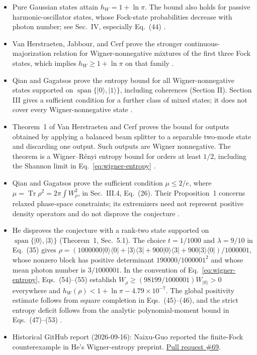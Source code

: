 \begin{itemize}
  \item Pure Gaussian states attain $h_W=1+\ln\pi$. The bound also holds for passive harmonic-oscillator states, whose Fock-state probabilities decrease with photon number; see Sec.~IV, especially Eq.~(44) .

  \item Van Herstraeten, Jabbour, and Cerf prove the stronger continuous-majorization relation for Wigner-nonnegative mixtures of the first three Fock states, which implies $h_W\geq1+\ln\pi$ on that family .

  \item Qian and Gagatsos prove the entropy bound for all Wigner-nonnegative states supported on $\operatorname{span}\{|0\rangle,|1\rangle\}$, including coherences (Section II). Section III gives a sufficient condition for a further class of mixed states; it does not cover every Wigner-nonnegative state .

  \item Theorem~1 of Van Herstraeten and Cerf proves the bound for outputs obtained by applying a balanced beam splitter to a separable two-mode state and discarding one output. Such outputs are Wigner nonnegative. The theorem is a Wigner--R\'enyi entropy bound for orders at least $1/2$, including the Shannon limit in Eq.~\eqref{eq:wigner-entropy} .

  \item Qian and Gagatsos prove the sufficient condition $\mu\leq2/e$, where $\mu=\operatorname{Tr}\rho^2=2\pi\int W_\rho^2$, in Sec.~III.4, Eq.~(26). Their Proposition~1 concerns relaxed phase-space constraints; its extremizers need not represent positive density operators and do not disprove the conjecture .

  \item He disproves the conjecture with a rank-two state supported on $\operatorname{span}\{|0\rangle,|3\rangle\}$ (Theorem~1, Sec.~5.1). The choice $t=1/1000$ and $\lambda=9/10$ in Eq.~(35) gives $\rho=(1000000|0\rangle\langle0|+|3\rangle\langle3|+900|0\rangle\langle3|+900|3\rangle\langle0|)/1000001$, whose nonzero block has positive determinant $190000/1000001^2$ and whose mean photon number is $3/1000001$. In the convention of Eq.~\eqref{eq:wigner-entropy}, Eqs.~(54)--(55) establish $W_\rho\geq(98199/1000001)W_{|0\rangle}>0$ everywhere and $h_W(\rho)<1+\ln\pi-4.79\times10^{-7}$. The global positivity estimate follows from square completion in Eqs.~(45)--(46), and the strict entropy deficit follows from the analytic polynomial-moment bound in Eqs.~(47)--(53) .

  \item Historical GitHub report (2026-09-16): Naixu-Guo reported the finite-Fock counterexample in He's Wigner-entropy preprint. \href{https://github.com/Naixu-Guo/quantum-open-problems/pull/69}{Pull request \#69}.
\end{itemize}

